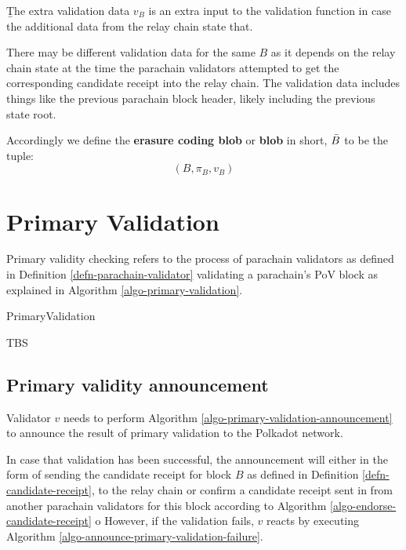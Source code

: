 \begin{definition}  \label{defn-extra-validation-data}
  {\b The extra validation data} $v_B$  is an extra input to the validation function in case the additional data from the relay chain state that.
\end{definition}

There may be different validation data for the same $B$ as it depends on the relay chain state at the time the parachain validators attempted to get the corresponding candidate receipt into the relay chain. The validation data includes things like the previous parachain block header, likely including the previous state root.

\begin{definition}
  \label{defn-blob}
  Accordingly we define the {\bf erasure coding blob} or {\bf blob} in short, {\bf $\bar{B}$} to be the tuple:
  \[
  (B, \pi_B, v_B)
  \]
\end{definition}

\section{Primary Validation}
\label{sect-primary-validation}

Primary validity checking refers to the process of parachain validators as defined in Definition \ref{defn-parachain-validator} validating a parachain's PoV block as explained in Algorithm \ref{algo-primary-validation}.

\begin{algorithm}
  \caption[]{\sc PrimaryValidation}
  \label{algo-primary-validation}
  \begin{algorithmic}[1]
    \Require{}
    
    \State TBS
  \end{algorithmic}
\end{algorithm}

\subsection{Primary validity announcement}
\label{sect-primary-validaty-announcement}
Validator $v$ needs to perform Algorithm \ref{algo-primary-validation-announcement} to announce the result of primary validation to the Polkadot network.

In case that validation has been successful, the announcement will either in the form of sending the candidate receipt for block $B$ as defined in Definition \ref{defn-candidate-receipt}, to the relay chain or confirm a candidate receipt sent in from another parachain validators for this block according to Algorithm \ref{algo-endorse-candidate-receipt}
o
However, if the validation fails, $v$ reacts by executing Algorithm \ref{algo-announce-primary-validation-failure}.

